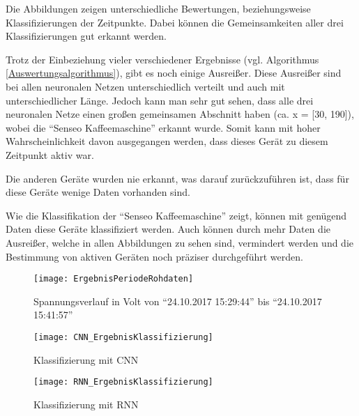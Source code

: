         \noindent
        Die Abbildungen zeigen unterschiedliche Bewertungen, beziehungsweise Klassifizierungen der Zeitpunkte.
        Dabei können die Gemeinsamkeiten aller drei Klassifizierungen gut erkannt werden.
        
        Trotz der Einbeziehung vieler verschiedener Ergebnisse (vgl. Algorithmus \ref{Auswertungsalgorithmus}), gibt es noch einige Ausreißer.
        Diese Ausreißer sind bei allen neuronalen Netzen unterschiedlich verteilt und auch mit unterschiedlicher Länge.
        Jedoch kann man sehr gut sehen, dass alle drei neuronalen Netze einen großen gemeinsamen Abschnitt haben (ca. x = [30, 190]), wobei die "`Senseo Kaffeemaschine"' erkannt wurde.
        Somit kann mit hoher Wahrscheinlichkeit davon ausgegangen werden, dass dieses Gerät zu diesem Zeitpunkt aktiv war.
        \newline

        \noindent
        Die anderen Geräte wurden nie erkannt, was darauf zurückzuführen ist, dass für diese Geräte wenige Daten vorhanden sind.
        
        Wie die Klassifikation der "`Senseo Kaffeemaschine"' zeigt, können mit genügend Daten diese Geräte klassifiziert werden.
        Auch können durch mehr Daten die Ausreißer, welche in allen Abbildungen zu sehen sind, vermindert werden und die Bestimmung von aktiven Geräten noch präziser durchgeführt werden.      
        
        \begin{figure}[H]
            \centering
            \texttt{[image: ErgebnisPeriodeRohdaten]}
            \caption{Spannungsverlauf in Volt von "`24.10.2017 15:29:44"' bis "`24.10.2017 15:41:57"'}
            \label{fig:ResultClassificationPeriod}
        \end{figure}

        \begin{figure}[H]
            \centering
            \texttt{[image: CNN\_ErgebnisKlassifizierung]}
            \caption{Klassifizierung mit CNN}
            \label{fig:CNN_RawClassification}
        \end{figure}

        \begin{figure}[H]
            \centering
            \texttt{[image: RNN\_ErgebnisKlassifizierung]}
            \caption{Klassifizierung mit RNN}
            \label{fig:RNN_RawClassification}
        \end{figure}

